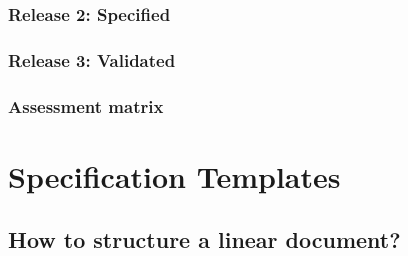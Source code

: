 \documentclass{reqengbook}
\begin{document}
\subsection{Release 2: Specified}
\subsection{Release 3: Validated}

\newpage
\subsection{Assessment matrix}

\begin{adjustbox}{width=2.0\textwidth}

\end{adjustbox} 

\chapter{Specification Templates}

\section{How to structure a linear document?}
\end{document}
